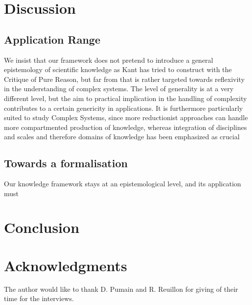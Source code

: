 \documentclass[runningheads,a4paper]{llncs2e/llncs}
\begin{document}
\section{Discussion}



\subsection{Application Range}

We insist that our framework does not pretend to introduce a general epistemology of scientific knowledge as Kant has tried to construct with the Critique of Pure Reason, but far from that is rather targeted towards reflexivity in the understanding of complex systems. The level of generality is at a very different level, but the aim to practical implication in the handling of complexity contributes to a certain genericity in applications. It is furthermore particularly suited to study Complex Systems, since more reductionist approaches can handle more compartmented production of knowledge, whereas integration of disciplines and scales and therefore domains of knowledge has been emphasized as crucial 


\subsection{Towards a formalisation}

Our knowledge framework stays at an epistemological level, and its application must 









\section{Conclusion}




\section*{Acknowledgments}

The author would like to thank D. Pumain and R. Reuillon for giving of their time for the interviews.






\end{document}
